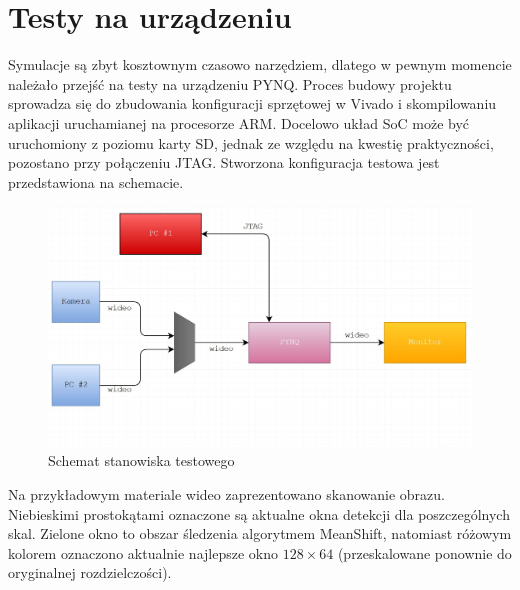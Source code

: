 \section{Testy na urządzeniu}

Symulacje są zbyt kosztownym czasowo narzędziem, dlatego w pewnym momencie należało przejść na testy na urządzeniu PYNQ. Proces budowy projektu sprowadza się do zbudowania konfiguracji sprzętowej w Vivado i skompilowaniu aplikacji uruchamianej na procesorze ARM. Docelowo układ SoC może być uruchomiony z poziomu karty SD, jednak ze względu na kwestię praktyczności, pozostano przy połączeniu JTAG. Stworzona konfiguracja testowa jest przedstawiona na schemacie.

\begin{figure}[h]
	\centering
	\includegraphics[width=16cm]{6_testing_setup.jpg}
	\caption{Schemat stanowiska testowego}
	\label{fig:testing_setup}
\end{figure}

Na przykładowym materiale wideo zaprezentowano skanowanie obrazu. Niebieskimi prostokątami oznaczone są aktualne okna detekcji dla poszczególnych skal. Zielone okno to obszar śledzenia algorytmem MeanShift, natomiast różowym kolorem oznaczono aktualnie najlepsze okno $128 \times 64$ (przeskalowane ponownie do oryginalnej rozdzielczości).

